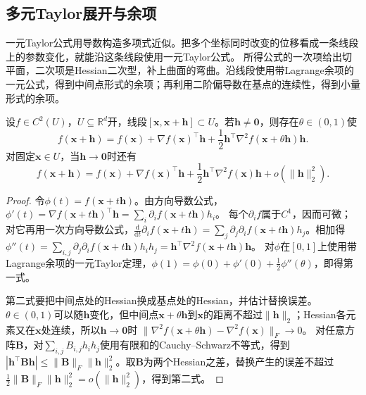\subsection{多元Taylor展开与余项}

一元Taylor公式用导数构造多项式近似。把多个坐标同时改变的位移看成一条线段上的参数变化，就能沿这条线段使用一元Taylor公式。
所得公式的一次项给出切平面，二次项是Hessian二次型，补上曲面的弯曲。沿线段使用带Lagrange余项的一元公式，得到中间点形式的余项；再利用二阶偏导数在基点的连续性，得到小量形式的余项。
\begin{theorem}[多元标量函数的二阶Taylor公式]
\label{thm:multivariable-second-order-taylor}
设$f\in C^2(U)$，$U\subseteq\mathbb R^d$开，线段$[\bm x,\bm x+\bm h]\subset U$。若$\bm h\neq\bm 0$，则存在$\theta\in(0,1)$使
\begin{equation}
 f(\bm x+\bm h)=f(\bm x)+\nabla f(\bm x)^\top\bm h
 +\frac12\bm h^\top\nabla^2f(\bm x+\theta\bm h)\bm h.
\label{eq:analysis-second-order-taylor}
\end{equation}
对固定$\bm x\in U$，当$\bm h\to\bm 0$时还有
\begin{equation}
 f(\bm x+\bm h)=f(\bm x)+\nabla f(\bm x)^\top\bm h
 +\frac12\bm h^\top\nabla^2f(\bm x)\bm h+o(\lVert\bm h\rVert_2^2).
\label{eq:analysis-second-order-local-model}
\end{equation}
\end{theorem}
\begin{proof}
令$\phi(t)=f(\bm x+t\bm h)$。由方向导数公式，$\phi'(t)=\nabla f(\bm x+t\bm h)^\top\bm h=\sum_i\partial_if(\bm x+t\bm h)h_i$。
每个$\partial_if$属于$C^1$，因而可微；对它再用一次方向导数公式，$\frac{\mathrm d}{\mathrm dt}\partial_if(\bm x+t\bm h)=\sum_j\partial_j\partial_if(\bm x+t\bm h)h_j$。相加得$\phi''(t)=\sum_{i,j}\partial_j\partial_if(\bm x+t\bm h)h_ih_j=\bm h^\top\nabla^2f(\bm x+t\bm h)\bm h$。
对$\phi$在$[0,1]$上使用带Lagrange余项的一元Taylor定理，$\phi(1)=\phi(0)+\phi'(0)+\tfrac12\phi''(\theta)$，即得第一式。

第二式要把中间点处的Hessian换成基点处的Hessian，并估计替换误差。$\theta\in(0,1)$可以随$\bm h$变化，但中间点$\bm x+\theta\bm h$到$\bm x$的距离不超过$\lVert\bm h\rVert_2$；Hessian各元素又在$\bm x$处连续，所以$\bm h\to\bm 0$时
$\lVert\nabla^2f(\bm x+\theta\bm h)-\nabla^2f(\bm x)\rVert_F\to0$。
对任意方阵$\bm B$，对$\sum_{i,j}B_{i,j}h_i h_j$使用有限和的Cauchy--Schwarz不等式，得到$|\bm h^\top\bm B\bm h|\leq\lVert\bm B\rVert_F\lVert\bm h\rVert_2^2$。取$\bm B$为两个Hessian之差，替换产生的误差不超过$\tfrac12\lVert\bm B\rVert_F\lVert\bm h\rVert_2^2=o(\lVert\bm h\rVert_2^2)$，得到第二式。
\end{proof}

